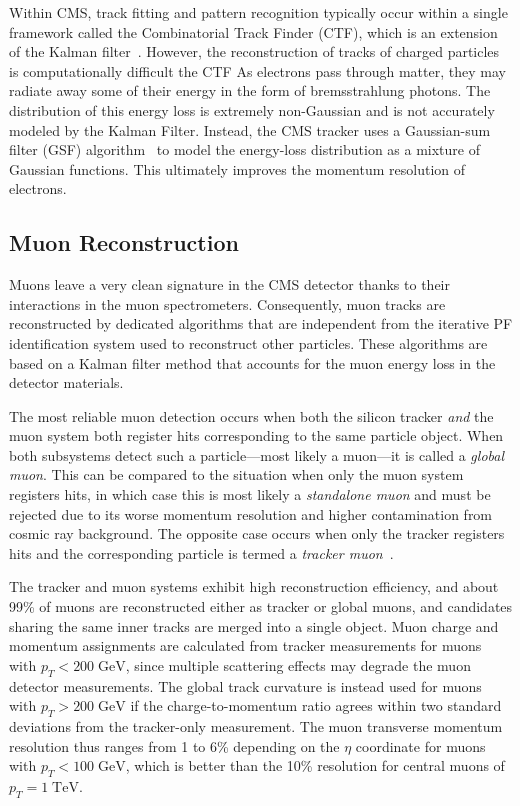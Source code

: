 Within CMS, track fitting and pattern recognition typically occur within a single framework called the Combinatorial Track Finder (CTF), which is an extension of the Kalman filter~\cite{general_track_reco}.
However, the reconstruction of tracks of charged particles is computationally difficult  the CTF 
As electrons pass through matter, they may radiate away some of their energy in the form of bremsstrahlung photons.
The distribution of this energy loss is extremely non-Gaussian and is not accurately modeled by the Kalman Filter.
Instead, the CMS tracker uses a Gaussian-sum filter (GSF) algorithm~\cite{gsf} to model the energy-loss distribution as a mixture of Gaussian functions.
This ultimately improves the momentum resolution of electrons.

\subsection{Muon Reconstruction}
\label{sec:muon_reco}

Muons leave a very clean signature in the CMS detector thanks to their interactions in the muon spectrometers. Consequently, muon tracks are reconstructed by dedicated algorithms that are independent from the iterative PF identification system used to reconstruct other particles. These algorithms are based on a Kalman filter method that accounts for the muon energy loss in the detector materials.

The most reliable muon detection occurs when both the silicon tracker \emph{and} the muon system both register hits corresponding to the same particle object.
When both subsystems detect such a particle---most likely a muon---it is called a \emph{global muon}.
This can be compared to the situation when only the muon system registers hits, in which case this is most likely a \emph{standalone muon} and must be rejected due to its worse momentum resolution and higher contamination from cosmic ray background.
The opposite case occurs when only the tracker registers hits and the corresponding particle is termed a \emph{tracker muon}~\cite{reco_muon}.

The tracker and muon systems exhibit high reconstruction efficiency, and about 99\% of muons are reconstructed either as tracker or global muons, and candidates sharing the same inner tracks are merged into a single object. Muon charge and momentum assignments are calculated from tracker measurements for muons with $p_T < 200 \;\text{GeV}$, since multiple scattering effects may degrade the muon detector measurements. The global track curvature is instead used for muons with $p_T > 200 \;\text{GeV}$ if the charge-to-momentum ratio agrees within two standard deviations from the tracker-only measurement. The muon transverse momentum resolution thus ranges from 1 to 6\% depending on the $\eta$ coordinate for muons with $p_T < 100 \;\text{GeV}$, which is better than the 10\% resolution for central muons of $p_T = 1 \;\text{TeV}$.

